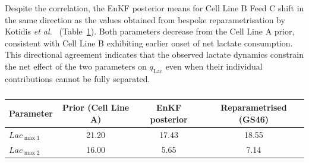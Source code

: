 Despite the correlation, the EnKF posterior means for Cell Line B Feed C shift in the same direction as the values obtained from bespoke reparametrisation by Kotidis \textit{et al.}~\cite{Kotidis2019UseCultures} (Table~\ref{tab:lacmax_comparison}). Both parameters decrease from the Cell Line A prior, consistent with Cell Line B exhibiting earlier onset of net lactate consumption. This directional agreement indicates that the observed lactate dynamics constrain the net effect of the two parameters on $q_{\mathrm{Lac}}$ even when their individual contributions cannot be fully separated. 
\begin{table}[ht]
\centering
\renewcommand{\arraystretch}{1.3}
\small
\caption{}
\label{tab:lacmax_comparison}
\begin{tabular}{|l|c|c|c|}
\hline
\rowcolor{gray!30}
\textbf{Parameter} & \textbf{Prior (Cell Line A)} & \textbf{EnKF posterior} & \textbf{Reparametrised (GS46)} \\
\hline
$Lac_{\max1}$ & 21.20 & 17.43 & 18.55 \\
$Lac_{\max2}$ & 16.00 & 5.65 & 7.14 \\
\hline
\end{tabular}
\end{table}
